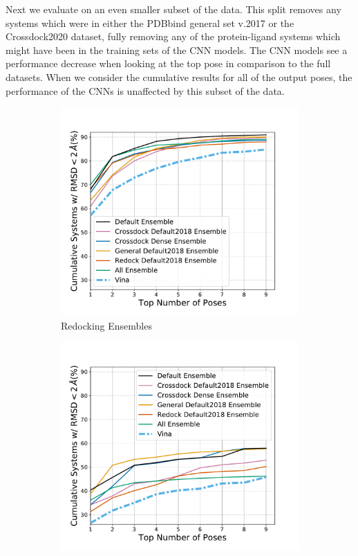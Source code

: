 \documentclass[journal=jcisd8,manuscript=article]{achemso}
\begin{document}
Next we evaluate on an even smaller subset of the data. This split removes any systems which were in either the PDBbind general set v.2017 or the Crossdock2020 dataset, fully removing any of the protein-ligand systems which might have been in the training sets of the CNN models. The CNN models see a performance decrease when looking at the top pose in comparison to the full datasets. When we consider the cumulative results for all of the output poses, the performance of the CNNs is unaffected by this subset of the data.

\begin{figure}    
        \begin{subfigure}[b]{0.48\textwidth}    
		\centering
		\includegraphics[width=\textwidth]{figures/redocking/ensemble_models_no2017_nocd2020_line.pdf}
		\caption{Redocking Ensembles}
		\label{fig:No2017NoCD20EnsRD}
        \end{subfigure}    
        \begin{subfigure}[b]{0.48\textwidth}    
		\centering
		\includegraphics[width=\textwidth]{figures/crossdocking/ensemble_models_no2017_nocd2020_line.pdf}

\end{subfigure}
\end{figure}
\end{document}
